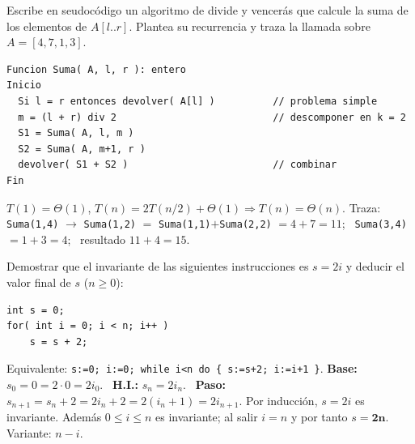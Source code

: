 \begin{prob}[ · A3]
Escribe en seudocódigo un algoritmo de divide y vencerás que calcule la suma de los elementos de $A[l..r]$. Plantea su recurrencia y traza la llamada sobre $A=[4,7,1,3]$.
\end{prob}
\begin{sol}
\begin{lstlisting}
Funcion Suma( A, l, r ): entero
Inicio
  Si l = r entonces devolver( A[l] )          // problema simple
  m = (l + r) div 2                           // descomponer en k = 2
  S1 = Suma( A, l, m )
  S2 = Suma( A, m+1, r )
  devolver( S1 + S2 )                         // combinar
Fin
\end{lstlisting}
$T(1)=\Theta(1)$, $T(n)=2T(n/2)+\Theta(1)\Rightarrow T(n)=\Theta(n)$.
Traza: \texttt{Suma(1,4)} $\to$ \texttt{Suma(1,2)} $=$ \texttt{Suma(1,1)}$+$\texttt{Suma(2,2)} $=4+7=11$; \ \texttt{Suma(3,4)} $=1+3=4$; \ resultado $11+4=15$.
\end{sol}

\begin{prob}[ · A4]
Demostrar que el invariante de las siguientes instrucciones es $s=2i$ y deducir el valor final de $s$ ($n\ge0$):
\begin{lstlisting}
int s = 0;
for( int i = 0; i < n; i++ )
    s = s + 2;
\end{lstlisting}
\end{prob}
\begin{sol}
Equivalente: \texttt{s:=0; i:=0; while i<n do \{ s:=s+2; i:=i+1 \}}.
\textbf{Base:} $s_0=0=2\cdot0=2i_0$. \ \textbf{H.I.:} $s_n=2i_n$. \ \textbf{Paso:} $s_{n+1}=s_n+2=2i_n+2=2(i_n+1)=2i_{n+1}$. Por inducción, $s=2i$ es invariante.
Además $0\le i\le n$ es invariante; al salir $i=n$ y por tanto $s=\mathbf{2n}$. Variante: $n-i$.
\end{sol}

